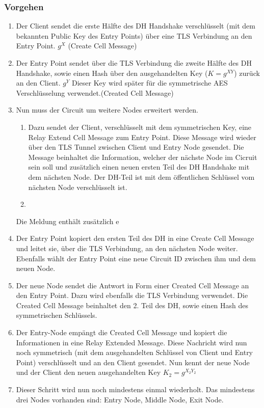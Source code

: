 \subsubsection{Vorgehen}
\begin{enumerate}
	\item Der Client sendet die erste Hälfte des DH Handshake verschlüsselt (mit dem bekannten Public Key des Entry Points) über eine TLS Verbindung an den Entry Point. $g^X$ (Create Cell Message)
	\item Der Entry Point sendet über die TLS Verbindung die zweite Hälfte des DH Handshake, sowie einen Hash über den ausgehandelten Key ($K=g^{XY}$) zurück an den Client. $g^Y$ Dieser Key wird später für die symmetrische AES Verschlüsselung verwendet.(Created Cell Message)
	\item Nun muss der Circuit um weitere Nodes erweitert werden. 
	\begin{enumerate}
	    \item Dazu sendet der Client, verschlüsselt mit dem symmetrischen Key, eine Relay Extend Cell Message zum Entry Point. Diese Message wird wieder über den TLS Tunnel zwischen Client und Entry Node gesendet. Die Message beinhaltet die Information, welcher der nächste Node im Cicruit sein soll und zusätzlich einen neuen ersten Teil des DH Handshake mit dem nächsten Node. Der DH-Teil ist mit dem öffentlichen Schlüssel vom nächsten Node verschlüsselt ist.
	    \item 
	\end{enumerate}
	 Die Meldung enthält zusätzlich e
	\item Der Entry Point kopiert den ersten Teil des DH in eine Create Cell Message und leitet sie, über die TLS Verbindung, an den nächsten Node weiter. Ebenfalls wählt der Entry Point eine neue Circuit ID zwischen ihm und dem neuen Node.
	\item Der neue Node sendet die Antwort in Form einer Created Cell Message an den Entry Point. Dazu wird ebenfalls die TLS Verbindung verwendet. Die Created Cell Message beinhaltet den 2. Teil des DH, sowie einen Hash des symmetrischen Schlüssels.
	\item Der Entry-Node empängt die Created Cell Message und kopiert die Informationen in eine Relay Extended Message. Diese Nachricht wird nun noch symmetrisch (mit dem ausgehandelten Schlüssel von Client und Entry Point) verschlüsselt und an den Client gesendet.
	Nun kennt der neue Node und der Client den neuen ausgehandelten  Key $K_2 = g^{X_2 Y_2}$
	\item Dieser Schritt wird nun noch mindestens einmal wiederholt. Das mindestens drei Nodes vorhanden sind: Entry Node, Middle Node, Exit Node.

\end{enumerate}
